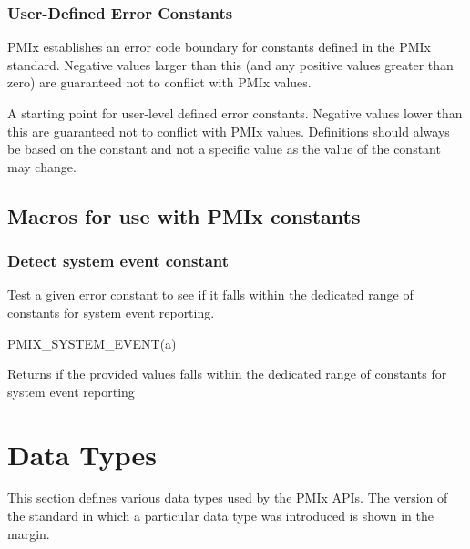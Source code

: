 \subsubsection{User-Defined Error Constants}

\ac{PMIx} establishes an error code boundary for constants defined in the \ac{PMIx} standard. Negative values larger than this (and any positive values greater than zero) are guaranteed not to conflict with \ac{PMIx} values.

\begin{constantdesc}
%
A starting point for user-level defined error constants.
Negative values lower than this are guaranteed not to conflict with \ac{PMIx} values.
Definitions should always be based on the  constant and not a specific value as the value of the constant may change.
%
\end{constantdesc}

\subsection{Macros for use with PMIx constants}

\subsubsection{Detect system event constant}

Test a given error constant to see if it falls within the dedicated range of constants for system event reporting.

\cspecificstart
\begin{codepar}
PMIX_SYSTEM_EVENT(a)
\end{codepar}
\cspecificend

\begin{arglist}
\end{arglist}

Returns  if the provided values falls within the dedicated range of constants for system event reporting


\section{Data Types}

This section defines various data types used by the PMIx APIs. The version of the standard in which a particular data type was introduced is shown in the margin.

